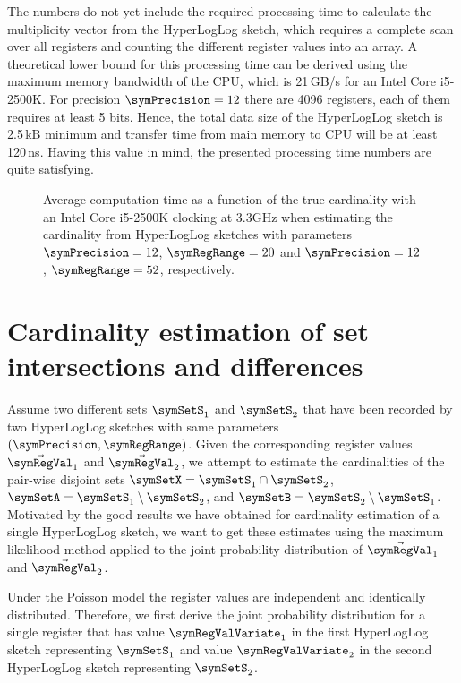 \documentclass[a4paper]{scrartcl}
\begin{document}
The numbers do not yet include the required processing time to calculate the multiplicity vector from the HyperLogLog sketch, which requires a complete scan over all registers and counting the different register values into an array. A theoretical lower bound for this processing time can be derived using the maximum memory bandwidth of the CPU, which is 21\,GB/s for an Intel Core i5-2500K. For precision $\symPrecision=12$ there are 4096 registers, each of them requires at least 5 bits. Hence, the total data size of the HyperLogLog sketch is 2.5\,kB minimum and transfer time from main memory to CPU will be at least 120\,ns. Having this value in mind, the presented processing time numbers are quite satisfying.

\begin{figure}
\centering

\caption{Average computation time as a function of the true cardinality with an Intel Core i5-2500K clocking at 3.3GHz when estimating the cardinality from HyperLogLog sketches with parameters $\symPrecision=12$, $\symRegRange=20$ and $\symPrecision=12$, $\symRegRange=52$, respectively.}
\label{fig:avg_exec_time}
\end{figure}

\section{Cardinality estimation of set intersections and differences}
Assume two different sets $\symSetS_1$ and $\symSetS_2$ that have been recorded by two HyperLogLog sketches with same parameters $(\symPrecision,\symRegRange)$. Given the corresponding register values $\vec{\symRegVal}_1$ and
$\vec{\symRegVal}_2$, we attempt to estimate the cardinalities of the pair-wise disjoint sets $\symSetX = \symSetS_1\cap\symSetS_2$, $\symSetA = \symSetS_1\setminus\symSetS_2$, and $\symSetB = \symSetS_2\setminus\symSetS_1$. Motivated by the good results we have obtained for cardinality estimation of a single HyperLogLog sketch, we want to get these estimates using the maximum likelihood method applied to the joint probability distribution of $\vec{\symRegVal}_1$ and $\vec{\symRegVal}_2$.

Under the Poisson model the register values are independent and identically distributed. Therefore, we first derive the joint probability distribution for a single register that has value $\symRegValVariate_1$ in the first HyperLogLog sketch representing $\symSetS_1$ and value $\symRegValVariate_2$ in the second HyperLogLog sketch representing $\symSetS_2$. 
\end{document}
